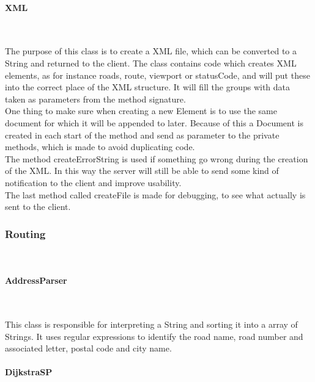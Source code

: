 \documentclass[a4paper,10pt,titlepage]{article}
\begin{document}
				
				\paragraph{XML}\mbox{}\
				
The purpose of this class is to create a XML file, which can be converted to a String and returned to the client. The class contains code which creates XML elements, as for instance roads, route, viewport or statusCode, and will put these into the correct place of the XML structure. It will fill the groups with data taken as parameters from the method signature. \\
One thing to make sure when creating a new Element is to use the same document for which it will be appended to later. Because of this a Document is created in each start of the method and send as parameter to the private methods, which is made to avoid duplicating code.\\
The method createErrorString is used if something go wrong during the creation of the XML. In this way the server will still be able to send some kind of notification to the client and improve usability.\\
The last method called createFile is made for debugging, to see what actually is sent to the client.\\


				
			\subsubsection{Routing}\
			
				\paragraph{AddressParser}\mbox{}\
				
This class is responsible for interpreting a String and sorting it into a array of Strings. It uses regular expressions to identify the road name, road number and associated letter, postal code and city name.
				
				\paragraph{DijkstraSP \cite{sedgewickAndWayneDijkstraSP}}\mbox{}\
				
\end{document}
